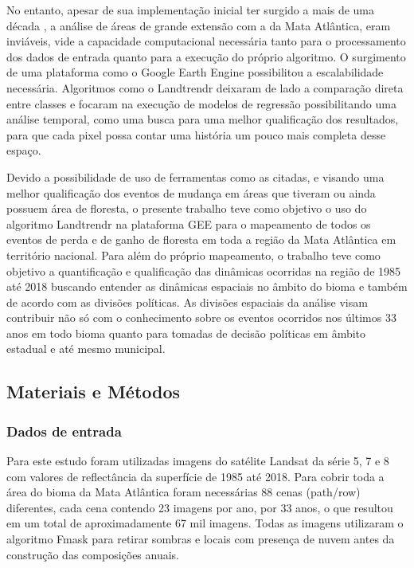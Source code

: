 No entanto, apesar de sua implementação inicial ter surgido a mais de uma década \citep{KENNEDY20102897}, a análise de áreas de grande extensão com a da Mata Atlântica, eram inviáveis, vide a capacidade computacional necessária tanto para o processamento dos dados de entrada quanto para a execução do próprio algoritmo. O surgimento de uma plataforma como o Google Earth Engine \citep{GORELICK201718} possibilitou a escalabilidade necessária. Algoritmos como o Landtrendr deixaram de lado a comparação direta entre classes e focaram na execução de modelos de regressão possibilitando uma análise temporal, como uma busca para uma melhor qualificação dos resultados, para que cada pixel possa contar uma história um pouco mais completa desse espaço.

Devido a possibilidade de uso de ferramentas como as citadas, e visando uma melhor qualificação dos eventos de mudança em áreas que tiveram ou ainda possuem área de floresta, o presente trabalho teve como objetivo o uso do algoritmo Landtrendr na plataforma GEE para o mapeamento de todos os eventos de perda e de ganho de floresta em toda a região da Mata Atlântica em território nacional. Para além do próprio mapeamento, o trabalho teve como objetivo a quantificação e qualificação das dinâmicas ocorridas na região de 1985 até 2018 buscando entender as dinâmicas espaciais no âmbito do bioma e também de acordo com as divisões políticas. As divisões espaciais da análise visam contribuir não só com o conhecimento sobre os eventos ocorridos nos últimos 33 anos em todo bioma quanto para tomadas de decisão políticas em âmbito estadual e até mesmo municipal. 

\subsection{Materiais e Métodos}
\subsubsection{Dados de entrada}
\hspace{13pt} Para este estudo foram utilizadas imagens do satélite Landsat da série 5, 7 e 8 com valores de reflectância da superfície de 1985 até 2018. Para cobrir toda a área do bioma da Mata Atlântica foram necessárias 88 cenas (path/row) diferentes, cada cena contendo 23 imagens por ano, por 33 anos, o que resultou em um total de aproximadamente 67 mil imagens. Todas as imagens utilizaram o algoritmo Fmask para retirar sombras e locais com presença de nuvem antes da construção das composições anuais. 

